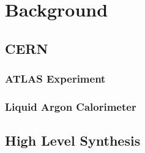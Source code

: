 \chapter{Background}\label{sec:background}
\parskip4pt \parindent12pt

\section{CERN}\label{sec:cern}

\subsection{ATLAS Experiment}\label{sec:atlas-experiment}

\subsection{Liquid Argon Calorimeter}\label{sec:liquid-argon-calorimeter}

\section{High Level Synthesis}\label{sec:high-level-synthesis}